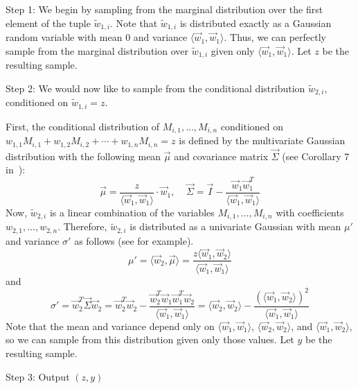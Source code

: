 \begin{description}
\item{Step 1:}
We begin by sampling from the marginal distribution over the first element of
the tuple $\tilde{w}_{1,i}$.  Note that $\tilde{w}_{1,i}$ is distributed
exactly as a Gaussian random variable with mean $0$ and variance $\langle
\vec{w}_1, \vec{w}_1 \rangle$.  Thus, we can perfectly sample from the marginal
distribution over $\tilde{w}_{1,i}$ given only $\langle \vec{w}_1, \vec{w}_1
\rangle$.  Let $z$ be the resulting sample.

\item{Step 2:} We would now like to sample from the conditional distribution
$\tilde{w}_{2,i}$, conditioned on $\tilde{w}_{1,i} = z$.

First, the conditional distribution of $M_{i,1}, \ldots, M_{i,n}$ conditioned
on $w_{1,1} M_{i,1} + w_{1,2} M_{i,2} + \cdots + w_{1,n} M_{i,n} = z$ is
defined by the multivariate Gaussian distribution with the following mean
$\vec{\mu}$ and covariance matrix $\vec{\Sigma}$
(see Corollary 7 in~\cite{C:DDGR20}):
\[
\vec{\mu} = \frac{z}{\langle \vec{w}_1, \vec{w}_1 \rangle} \cdot \vec{w}_1
, ~~~~~
\vec{\Sigma} = \vec{I} - \frac{\vec{w}_1\vec{w}_1^T}{\langle \vec{w}_1, \vec{w}_1 \rangle}
\]
Now, $\tilde{w}_{2,i}$ is a linear combination of the variables $M_{i,1},
\ldots, M_{i,n}$ with coefficients $w_{2,1}, \ldots, w_{2,n}$.  Therefore,
$\tilde{w}_{2,i}$ is distributed as a univariate Gaussian with mean $\mu'$ and
variance $\sigma'$ as follows (see \cite{Liu} for example).
\[
\mu' = \langle \vec{w}_2, \vec{\mu} \rangle = \frac{z \langle \vec{w}_1,
\vec{w}_2 \rangle}{\langle \vec{w}_1, \vec{w}_1 \rangle} 
\]
and
\[
\sigma' = \vec{w}_2^T\vec{\Sigma}\vec{w}_2
= \vec{w}_2^T\vec{w}_2 - \frac{\vec{w}_2^T\vec{w}_1\vec{w}_1^T\vec{w}_2}{\langle \vec{w}_1, \vec{w}_1 \rangle}
= \langle \vec{w}_2, \vec{w}_2 \rangle -
\frac{(\langle \vec{w}_1, \vec{w}_2 \rangle)^2}{\langle \vec{w}_1, \vec{w}_1 \rangle}
\]
Note that the mean and variance depend only on 
$\langle \vec{w}_1, \vec{w}_1 \rangle$, 
$\langle \vec{w}_2, \vec{w}_2 \rangle$,
and $\langle \vec{w}_1, \vec{w}_2 \rangle$,
so we can sample from this distribution given only
those values.
Let $y$ be the resulting sample.
\item{Step 3:}
Output $(z, y)$
\end{description}


 